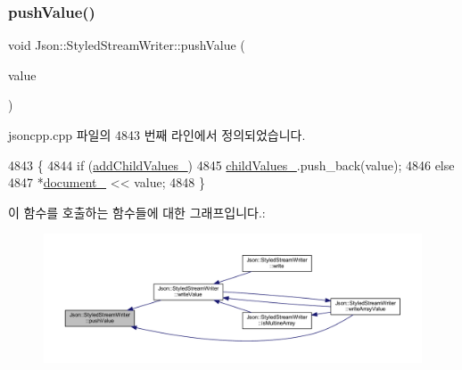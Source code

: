 \mbox{\label{class_json_1_1_styled_stream_writer_a9adb47185695f07b1979d8f4c5347592}} 
\subsubsection{\texorpdfstring{push\+Value()}{pushValue()}}
{\footnotesize\ttfamily void Json\+::\+Styled\+Stream\+Writer\+::push\+Value (\begin{DoxyParamCaption}\item[{const \hyperlink{json_8h_a1e723f95759de062585bc4a8fd3fa4be}{J\+S\+O\+N\+C\+P\+P\+\_\+\+S\+T\+R\+I\+NG} \&}]{value }\end{DoxyParamCaption})\hspace{0.3cm}{\ttfamily [private]}}



jsoncpp.\+cpp 파일의 4843 번째 라인에서 정의되었습니다.


\begin{DoxyCode}
4843                                                               \{
4844   \textcolor{keywordflow}{if} (\hyperlink{class_json_1_1_styled_stream_writer_a4e4bb7fc223b2652b72b523b1ce414fa}{addChildValues\_})
4845     \hyperlink{class_json_1_1_styled_stream_writer_aafd62e00a401df73fcacb2e410114b3d}{childValues\_}.push\_back(value);
4846   \textcolor{keywordflow}{else}
4847     *\hyperlink{class_json_1_1_styled_stream_writer_aa8c4e4576f5c3dcb10955d133a092dd6}{document\_} << value;
4848 \}
\end{DoxyCode}
이 함수를 호출하는 함수들에 대한 그래프입니다.\+:\nopagebreak
\begin{figure}[H]
\begin{center}
\leavevmode
\includegraphics[width=350pt]{class_json_1_1_styled_stream_writer_a9adb47185695f07b1979d8f4c5347592_icgraph}
\end{center}
\end{figure}
\mbox{\label{class_json_1_1_styled_stream_writer_a74d8fb9beecd29759d7b79f430386358}} 
